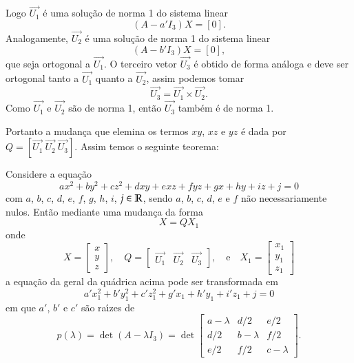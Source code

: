 Logo $\vec{U_1}$ \'e uma solu\c{c}\~ao de norma 1 do sistema linear
\[
  (A - a'I_3)X = [0].
\]
Analogamente, $\vec{U_2}$ \'e uma solu\c{c}\~ao de norma 1 do sistema linear
\[
  (A - b'I_3)X = [0],
\]
que seja ortogonal a $\vec{U_1}$. O terceiro vetor $\vec{U_3}$ \'e obtido de forma an\'aloga e deve ser ortogonal tanto a $\vec{U_1}$ quanto a $\vec{U_2}$, assim podemos tomar
\[
	\vec{U_3} = \vec{U_1}\times\vec{U_2}.
\]
Como $\vec{U_1}$ e $\vec{U_2}$ s\~ao de norma 1, ent\~ao $\vec{U_3}$ tamb\'em \'e de norma 1.

Portanto a mudan\c{c}a que elemina os termos $xy$, $xz$ e $yz$ \'e dada por $Q = [\vec{U_1}\ \vec{U_2}\ \vec{U_3}]$. Assim temos o seguinte teorema:

\begin{teorema}
  Considere a equa\c{c}\~ao
  \[
      ax^2 + by^2 + cz^2 + dxy + exz + fyz + gx + hy + iz + j = 0
  \]
  com $a$, $b$, $c$, $d$, $e$, $f$, $g$, $h$, $i$, $j \in \mathbb{R}$, sendo $a$, $b$, $c$, $d$, $e$ e $f$ n\~ao necessariamente nulos. Ent\~ao mediante uma mudan\c{c}a da forma
  \[
    X = Q X_1
  \]
  onde
  \[
    X = \begin{bmatrix}
      x\\y\\z
    \end{bmatrix}, \quad
    Q = \begin{bmatrix}
    	\vec{U_1} & \vec{U_2} & \vec{U_3}
  \end{bmatrix}, \quad\mbox{e}\quad
  X_1 = \begin{bmatrix}
    x_1\\y_1\\z_1
  \end{bmatrix}
  \]
  a equa\c{c}\~ao da geral da qu\'adrica acima pode ser transformada em
  \[
    a'x_1^2 + b'y_1^2 + c'z_1^2 + g'x_1 + h'y_1 + i'z_1 + j = 0
  \]
  em que $a'$, $b'$ e $c'$ s\~ao ra{\'\i}zes de
  \[
    p(\lambda) = \det(A - \lambda I_3) = \det \begin{bmatrix}
      a - \lambda & d/2 & e/2\\
      d/2 & b - \lambda & f/2\\
      e/2 & f/2 & c - \lambda
    \end{bmatrix}.
  \]


\end{teorema}
